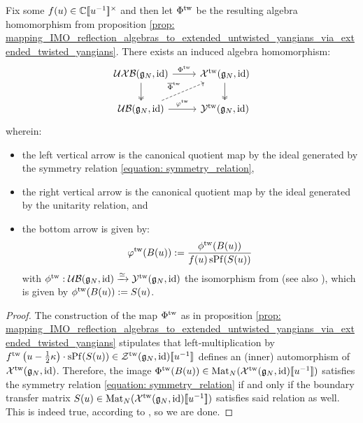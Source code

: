             \begin{theorem} \label{theorem: IMO_reflection_algebras_vs_BCD0_twisted_yangians}
                Fix some $f(u) \in \bbC[\![u^{-1}]\!]^{\x}$ and then let $\Phi^{\mathrm{tw}}$ be the resulting algebra homomorphism from proposition \ref{prop: mapping_IMO_reflection_algebras_to_extended_untwisted_yangians_via_extended_twisted_yangians}. There exists an induced algebra homomorphism:
                    $$
                        \begin{tikzcd}
                    	{\UXB(\g_N, \id)} & {\calX^{\tw}(\g_N, \id)} \\
                    	{\UB(\g_N, \id)} & {\calY^{\tw}(\g_N, \id)}
                    	\arrow["{{\Phi^{\tw}}}", from=1-1, to=1-2]
                    	\arrow[two heads, from=1-1, to=2-1]
                    	\arrow[two heads, from=1-2, to=2-2]
                    	\arrow["{{\overline{\Phi}^{\tw}}}", dashed, from=2-1, to=1-2]
                    	\arrow["\varphi^{\tw}", from=2-1, to=2-2]
                        \end{tikzcd}
                    $$
                wherein:
                \begin{itemize}
                    \item the left vertical arrow is the canonical quotient map by the ideal generated by the symmetry relation \eqref{equation: symmetry_relation},
                    \item the right vertical arrow is the canonical quotient map by the ideal generated by the unitarity relation, and
                    \item the bottom arrow is given by:
                        $$\varphi^{\mathrm{tw}}( B(u) ) := \frac{ \phi^{\mathrm{tw}}( B(u) ) }{ f(u) \operatorname{sPf}( S(u) ) }$$
                    with $\phi^{\mathrm{tw}}: \mathcal{UB}(\mathfrak{g}_N, \mathrm{id}) \xrightarrow[]{\simeq} \mathcal{Y}^{\mathrm{tw}}(\mathfrak{g}_N, \mathrm{id})$ the isomorphism from \cite[Theorem 4.1]{guay_regelskis_twisted_yangians_for_symmetric_pairs_of_types_BCD} (see also \cite[Equation 4.32]{guay_regelskis_twisted_yangians_for_symmetric_pairs_of_types_BCD}), which is given by $\phi^{\mathrm{tw}}( B(u) ) := S(u)$. 
                \end{itemize}
            \end{theorem}
                \begin{proof}
                    The construction of the map $\Phi^{\mathrm{tw}}$ as in proposition \ref{prop: mapping_IMO_reflection_algebras_to_extended_untwisted_yangians_via_extended_twisted_yangians} stipulates that left-multiplication by $f^{\mathrm{tw}}\left( u - \frac12 \kappa \right) \cdot \operatorname{sPf}( S(u) ) \in \mathcal{Z}^{\mathrm{tw}}(\mathfrak{g}_N, \mathrm{id})[\![u^{-1}]\!]$ defines an (inner) automorphism of $\mathcal{X}^{\mathrm{tw}}(\mathfrak{g}_N, \mathrm{id})$. Therefore, the image $\Phi^{\mathrm{tw}}( B(u) ) \in \mathrm{Mat}_N( \mathcal{X}^{\mathrm{tw}}(\mathfrak{g}_N, \mathrm{id})[\![u^{-1}]\!] )$ satisfies the symmetry relation \eqref{equation: symmetry_relation} if and only if the boundary transfer matrix $S(u) \in \mathrm{Mat}_N( \mathcal{X}^{\mathrm{tw}}(\mathfrak{g}_N, \mathrm{id})[\![u^{-1}]\!] )$ satisfies said relation as well. This is indeed true, according to \cite[Lemma 4.3]{guay_regelskis_twisted_yangians_for_symmetric_pairs_of_types_BCD}, so we are done.
                \end{proof}
